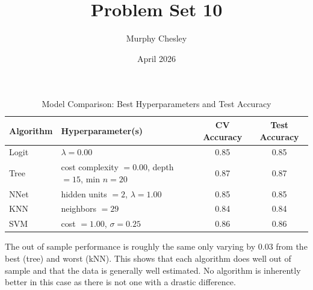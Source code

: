 \documentclass{article}
\title{Problem Set 10}
\author{Murphy Chesley}
\date{April 2026}
\begin{document}
\maketitle

\begin{table}[h]
\centering
\caption{Model Comparison: Best Hyperparameters and Test Accuracy}
\begin{tabular}{llcc}
\toprule
\textbf{Algorithm} & \textbf{Hyperparameter(s)} & \textbf{CV Accuracy} & \textbf{Test Accuracy} \\
\midrule
Logit  & $\lambda = 0.00$                                      & 0.85 & 0.85 \\
Tree   & cost complexity $= 0.00$, depth $= 15$, min $n = 20$ & 0.87 & 0.87 \\
NNet   & hidden units $= 2$, $\lambda = 1.00$                  & 0.85 & 0.85 \\
KNN    & neighbors $= 29$                                      & 0.84 & 0.84 \\
SVM    & cost $= 1.00$, $\sigma = 0.25$                        & 0.86 & 0.86 \\
\bottomrule
\end{tabular}
\end{table}

The out of sample performance is roughly the same only varying by 0.03 from the best (tree) and worst (kNN). This shows that each algorithm does well out of sample and that the data is generally well estimated. No algorithm is inherently better in this case as there is not one with a drastic difference.
\end{document}
